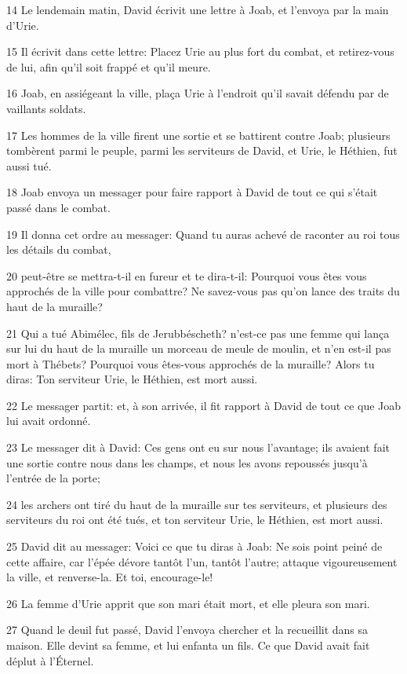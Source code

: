 \par 14 Le lendemain matin, David écrivit une lettre à Joab, et l'envoya par la main d'Urie.
\par 15 Il écrivit dans cette lettre: Placez Urie au plus fort du combat, et retirez-vous de lui, afin qu'il soit frappé et qu'il meure.
\par 16 Joab, en assiégeant la ville, plaça Urie à l'endroit qu'il savait défendu par de vaillants soldats.
\par 17 Les hommes de la ville firent une sortie et se battirent contre Joab; plusieurs tombèrent parmi le peuple, parmi les serviteurs de David, et Urie, le Héthien, fut aussi tué.
\par 18 Joab envoya un messager pour faire rapport à David de tout ce qui s'était passé dans le combat.
\par 19 Il donna cet ordre au messager: Quand tu auras achevé de raconter au roi tous les détails du combat,
\par 20 peut-être se mettra-t-il en fureur et te dira-t-il: Pourquoi vous êtes vous approchés de la ville pour combattre? Ne savez-vous pas qu'on lance des traits du haut de la muraille?
\par 21 Qui a tué Abimélec, fils de Jerubbéscheth? n'est-ce pas une femme qui lança sur lui du haut de la muraille un morceau de meule de moulin, et n'en est-il pas mort à Thébets? Pourquoi vous êtes-vous approchés de la muraille? Alors tu diras: Ton serviteur Urie, le Héthien, est mort aussi.
\par 22 Le messager partit: et, à son arrivée, il fit rapport à David de tout ce que Joab lui avait ordonné.
\par 23 Le messager dit à David: Ces gens ont eu sur nous l'avantage; ils avaient fait une sortie contre nous dans les champs, et nous les avons repoussés jusqu'à l'entrée de la porte;
\par 24 les archers ont tiré du haut de la muraille sur tes serviteurs, et plusieurs des serviteurs du roi ont été tués, et ton serviteur Urie, le Héthien, est mort aussi.
\par 25 David dit au messager: Voici ce que tu diras à Joab: Ne sois point peiné de cette affaire, car l'épée dévore tantôt l'un, tantôt l'autre; attaque vigoureusement la ville, et renverse-la. Et toi, encourage-le!
\par 26 La femme d'Urie apprit que son mari était mort, et elle pleura son mari.
\par 27 Quand le deuil fut passé, David l'envoya chercher et la recueillit dans sa maison. Elle devint sa femme, et lui enfanta un fils. Ce que David avait fait déplut à l'Éternel.

